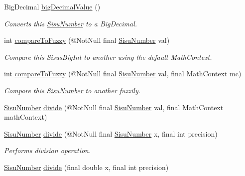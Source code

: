 \begin{DoxyCompactItemize}
Big\+Decimal \hyperlink{classcom_1_1aarrelaakso_1_1drawl_1_1_sisu_number_a75650999d142612f813ee7ba74ca1318}{big\+Decimal\+Value} ()
\begin{DoxyCompactList}\small\item\em Converts this \hyperlink{classcom_1_1aarrelaakso_1_1drawl_1_1_sisu_number}{Sisu\+Number} to a Big\+Decimal. \end{DoxyCompactList}\item 
int \hyperlink{classcom_1_1aarrelaakso_1_1drawl_1_1_sisu_number_ab061427f9847de3dfd0cb241abd3cd33}{compare\+To\+Fuzzy} (@Not\+Null final \hyperlink{classcom_1_1aarrelaakso_1_1drawl_1_1_sisu_number}{Sisu\+Number} val)
\begin{DoxyCompactList}\small\item\em Compare this Sisus\+Big\+Int to another using the default Math\+Context. \end{DoxyCompactList}\item 
int \hyperlink{classcom_1_1aarrelaakso_1_1drawl_1_1_sisu_number_a0835c9bb9e1bba532983d61844b37109}{compare\+To\+Fuzzy} (@Not\+Null final \hyperlink{classcom_1_1aarrelaakso_1_1drawl_1_1_sisu_number}{Sisu\+Number} val, final Math\+Context mc)
\begin{DoxyCompactList}\small\item\em Compare this \hyperlink{classcom_1_1aarrelaakso_1_1drawl_1_1_sisu_number}{Sisu\+Number} to another fuzzily. \end{DoxyCompactList}\item 
\hyperlink{classcom_1_1aarrelaakso_1_1drawl_1_1_sisu_number}{Sisu\+Number} \hyperlink{classcom_1_1aarrelaakso_1_1drawl_1_1_sisu_number_a79b82b6be0a884a272b80d3462fb0c17}{divide} (@Not\+Null final \hyperlink{classcom_1_1aarrelaakso_1_1drawl_1_1_sisu_number}{Sisu\+Number} val, final Math\+Context math\+Context)
\item 
\hyperlink{classcom_1_1aarrelaakso_1_1drawl_1_1_sisu_number}{Sisu\+Number} \hyperlink{classcom_1_1aarrelaakso_1_1drawl_1_1_sisu_number_ab081d05ed15ab685b2dca36a987d5f63}{divide} (@Not\+Null final \hyperlink{classcom_1_1aarrelaakso_1_1drawl_1_1_sisu_number}{Sisu\+Number} x, final int precision)
\begin{DoxyCompactList}\small\item\em Performs division operation. \end{DoxyCompactList}\item 
\hyperlink{classcom_1_1aarrelaakso_1_1drawl_1_1_sisu_number}{Sisu\+Number} \hyperlink{classcom_1_1aarrelaakso_1_1drawl_1_1_sisu_number_a1d3eea8f14d4700647f1c21cfe366593}{divide} (final double x, final int precision)

\end{DoxyCompactItemize}
